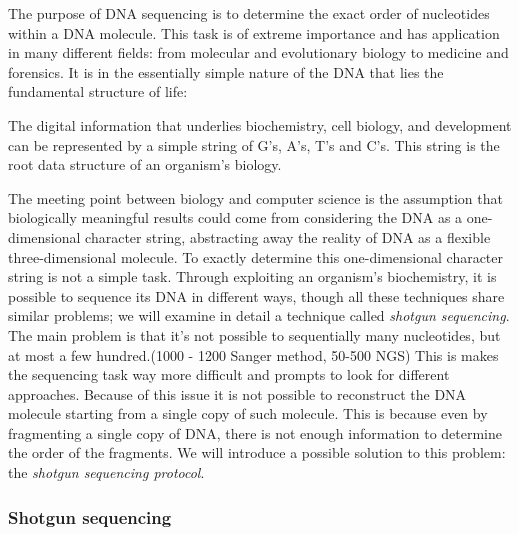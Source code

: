 \documentclass[a4paper,12pt, oneside]{article}
\begin{document}
The purpose of DNA sequencing is to determine the exact order of nucleotides within a DNA molecule. This task is of extreme importance and has application in many different fields: from molecular and evolutionary biology to medicine and forensics. It is in the essentially simple nature of the DNA that lies the fundamental structure of life:
\begin{displayquote}
The digital information that underlies biochemistry, cell biology, and development can be represented by a simple string of G's, A's, T's and C's. This string is the root data structure of an organism's biology. \cite{olsontimetosequence}
\end{displayquote}
The meeting point between biology and computer science is the assumption that biologically meaningful results could come from considering the DNA as a one-dimensional character string, abstracting away the reality of DNA as a flexible three-dimensional molecule.
To exactly determine this one-dimensional character string is not a simple task. Through exploiting an organism's biochemistry, it is possible to sequence its DNA in different ways, though all these techniques share similar problems; we will examine in detail a technique called \textit{shotgun sequencing}.
The main problem is that it's not possible to sequentially  many nucleotides, but at most a few hundred.(1000 - 1200 Sanger method, 50-500 NGS) \cite{gusfield} This is makes the sequencing task way more difficult and prompts to look for different approaches. Because of this issue it is not possible to reconstruct the DNA molecule starting from a single copy of such molecule. This is because even by fragmenting a single copy of DNA, there is not enough information to determine the order of the fragments. We will introduce a possible solution to this problem: the \textit{shotgun sequencing protocol}.

\subsubsection{Shotgun sequencing}
\end{document}
